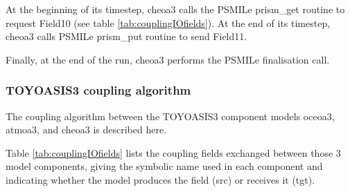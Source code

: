 At the beginning of its timestep, cheoa3 calls the PSMILe prism\_get
routine to request Field10 (see table \ref{tab:couplingIOfields}). At
the end of its timestep, cheoa3 calls PSMILe prism\_put routine to send
Field11. 

Finally, at the end of the run, cheoa3 performs the PSMILe finalisation call.

\subsubsection{TOYOASIS3 coupling algorithm}

 The coupling algorithm between the TOYOASIS3 component models oceoa3, atmoa3,
 and cheoa3 is described here.
 
Table \ref{tab:couplingIOfields} lists the coupling fields exchanged
between those 3 model components, giving the symbolic name used in
each component and indicating whether the model produces the field
(src) or receives it (tgt).
 
